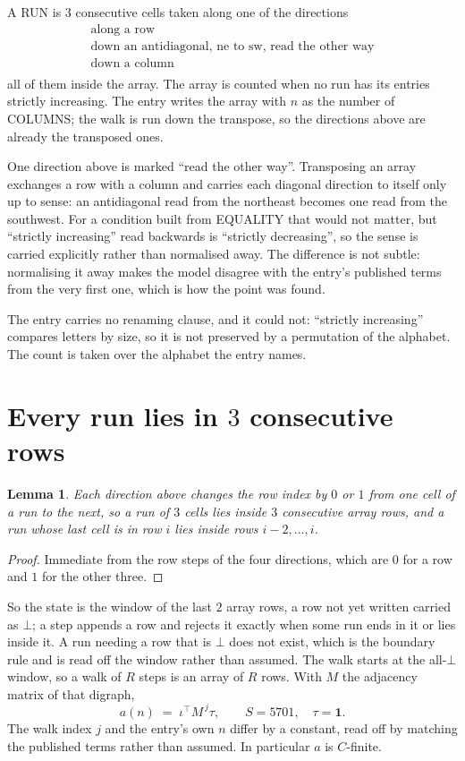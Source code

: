 \documentclass[11pt,a4paper]{article}
\theoremstyle{plain}
\newtheorem{lemma}[theorem]{Lemma}
\theoremstyle{definition}
\begin{document}
A RUN is $3$ consecutive cells taken along one of the directions
\[
\begin{array}{l}
\text{along a row} \\
\text{down an antidiagonal, ne to sw, read the other way} \\
\text{down a column} \\
\end{array}
\]
all of them inside the array. The array is counted when no run has its entries strictly increasing. The entry writes the array with $n$ as the number of COLUMNS; the walk is run down the transpose, so the directions above are already the transposed ones.


One direction above is marked ``read the other way''. Transposing an array exchanges a row with
a column and carries each diagonal direction to itself only up to sense: an antidiagonal read
from the northeast becomes one read from the southwest. For a condition built from EQUALITY
that would not matter, but ``strictly increasing'' read backwards is ``strictly decreasing'',
so the sense is carried explicitly rather than normalised away. The
difference is not subtle: normalising it away makes the model disagree with the entry's
published terms from the very first one, which is how the point was found.

The entry carries no renaming clause, and it could not: ``strictly increasing'' compares
letters by size, so it is not preserved by a permutation of the alphabet. The count is taken
over the alphabet the entry names.

\section{Every run lies in $3$ consecutive rows}

\begin{lemma}\label{lem:win}
Each direction above changes the row index by $0$ or $1$ from one cell of a run to the next, so
a run of $3$ cells lies inside $3$ consecutive array rows, and a run whose last cell is in
row $i$ lies inside rows $i-2,\dots,i$.
\end{lemma}

\begin{proof}
Immediate from the row steps of the four directions, which are $0$ for a row and $1$ for the
other three.
\end{proof}

So the state is the window of the last $2$ array rows, a row not yet written carried as
$\bot$; a step appends a row and rejects it exactly when some run ends in it or lies inside it.
A run needing a row that is $\bot$ does not exist, which is the boundary rule and is read off
the window rather than assumed. The walk starts at the all-$\bot$ window, so a walk of $R$ steps
is an array of $R$ rows. With $M$ the adjacency matrix of that digraph,
\[
a(n)\;=\;\iota^{\!\top}M^{\,j}\tau ,\qquad S=5701,\quad\tau=\mathbf{1} .
\]
The walk index $j$ and the entry's own $n$ differ by a constant, read off by matching the
published terms rather than assumed. In particular $a$ is $C$-finite.
\end{document}
